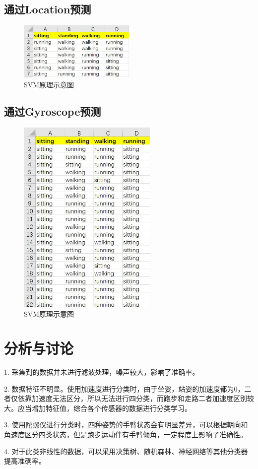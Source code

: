 \documentclass[UTF8]{ctexart}
\begin{document}
\subsection{通过Location预测}
\begin{figure}[H]
    \centering
    \includegraphics[width=0.5\textwidth]{pic/pre_loc.jpg}
    \caption{SVM原理示意图}
    \label{fig:demo}
\end{figure}

\subsection{通过Gyroscope预测}
\begin{figure}[H]
    \centering
    \includegraphics[width=0.6\textwidth]{pic/pre_Gyr.jpg}
    \caption{SVM原理示意图}
    \label{fig:demo}
\end{figure}
\section{分析与讨论}
1. 采集到的数据并未进行滤波处理，噪声较大，影响了准确率。

2. 数据特征不明显。使用加速度进行分类时，由于坐姿，站姿的加速度都为0，二者仅依靠加速度无法区分，所以无法进行四分类，而跑步和走路二者加速度区别较大。应当增加特征值，综合各个传感器的数据进行分类学习。

3. 使用陀螺仪进行分类时，四种姿势的手臂状态会有明显差异，可以根据朝向和角速度区分四类状态，但是跑步运动伴有手臂倾角，一定程度上影响了准确性。

4. 对于此类非线性的数据，可以采用决策树、随机森林、神经网络等其他分类器提高准确率。
\end{document}
